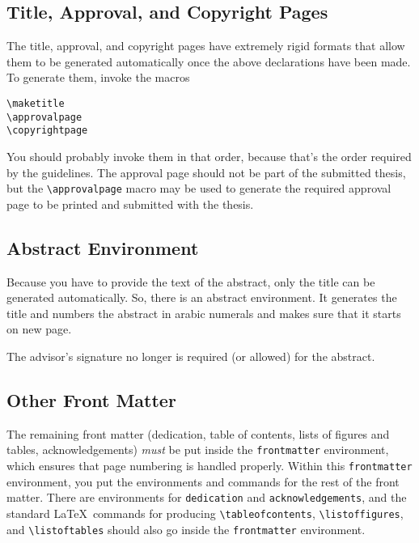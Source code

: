 \documentclass[11pt]{article}
\begin{document}
\subsection{Title, Approval, and Copyright Pages}

The title, approval, and copyright pages have extremely rigid formats
that allow them to be generated automatically once the above
declarations have been made.  To generate them, invoke the macros
\begin{lstlisting}
\maketitle
\approvalpage
\copyrightpage
\end{lstlisting}

You should probably invoke them in that order, because that's the
order required by the guidelines.  The approval page should not be part
of the submitted thesis, but the \verb|\approvalpage| macro may be used to
generate the required approval page to be printed and submitted with the
thesis.

\subsection{Abstract Environment}

Because you have to provide the text of the abstract, only the title
can be generated automatically.  So, there is an abstract environment.
It generates the title and numbers the abstract in arabic numerals and
makes sure that it starts on new page.

The advisor's signature no longer is required (or allowed) for the
abstract.

\subsection{Other Front Matter}

The remaining front matter (dedication, table of contents, lists of
figures and tables, acknowledgements) \emph{must} be put inside the
\verb|frontmatter| environment, which ensures that page numbering is
handled properly.  Within this \verb|frontmatter| environment, you put the
environments and commands for the rest of the front matter.  There are
environments for \texttt{dedication} and \texttt{acknowledgements},
and the standard \LaTeX\ commands for producing \verb|\tableofcontents|,
\verb|\listoffigures|, and \verb|\listoftables| should also go inside
the \verb|frontmatter| environment.
\end{document}
